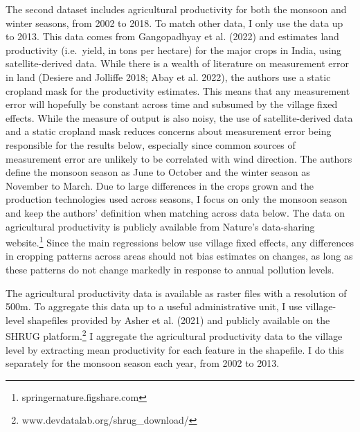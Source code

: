 \documentclass[
]{article}
\begin{document}
The second dataset includes agricultural productivity for both the monsoon and winter seasons, from 2002 to 2018. To match other data, I only use the data up to 2013. This data comes from Gangopadhyay et al. (2022) and estimates land productivity (i.e.~yield, in tons per hectare) for the major crops in India, using satellite-derived data. While there is a wealth of literature on measurement error in land (Desiere and Jolliffe 2018; Abay et al. 2022), the authors use a static cropland mask for the productivity estimates. This means that any measurement error will hopefully be constant across time and subsumed by the village fixed effects. While the measure of output is also noisy, the use of satellite-derived data and a static cropland mask reduces concerns about measurement error being responsible for the results below, especially since common sources of measurement error are unlikely to be correlated with wind direction. The authors define the monsoon season as June to October and the winter season as November to March. Due to large differences in the crops grown and the production technologies used across seasons, I focus on only the monsoon season and keep the authors' definition when matching across data below. The data on agricultural productivity is publicly available from Nature's data-sharing website.\footnote{springernature.figshare.com} Since the main regressions below use village fixed effects, any differences in cropping patterns across areas should not bias estimates on changes, as long as these patterns do not change markedly in response to annual pollution levels.

The agricultural productivity data is available as raster files with a resolution of 500m. To aggregate this data up to a useful administrative unit, I use village-level shapefiles provided by Asher et al. (2021) and publicly available on the SHRUG platform.\footnote{www.devdatalab.org/shrug\_download/} I aggregate the agricultural productivity data to the village level by extracting mean productivity for each feature in the shapefile. I do this separately for the monsoon season each year, from 2002 to 2013.
\end{document}
